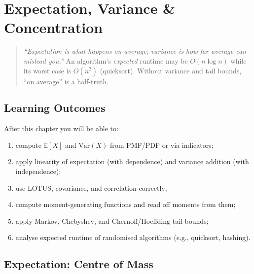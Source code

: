 \chapter{Expectation, Variance \& Concentration}
\label{ch:expectation}

\begin{quote}
\emph{``Expectation is what happens on average; variance is how far average can mislead you.''} An algorithm's \emph{expected} runtime may be $O(n\log n)$ while its worst case is $O(n^2)$ (quicksort). Without variance and tail bounds, ``on average'' is a half-truth.
\end{quote}

\noindent{}
\vspace{0.4em}

\section*{Learning Outcomes}
After this chapter you will be able to:
\begin{enumerate}[label=(L\arabic*)]
    \item compute $\mathbb{E}[X]$ and $\mathrm{Var}(X)$ from PMF/PDF or via indicators;
    \item apply linearity of expectation (with dependence) and variance addition (with independence);
    \item use LOTUS, covariance, and correlation correctly;
    \item compute moment-generating functions and read off moments from them;
    \item apply Markov, Chebyshev, and Chernoff/Hoeffding tail bounds;
    \item analyse expected runtime of randomised algorithms (e.g., quicksort, hashing).
\end{enumerate}

\section{Expectation: Centre of Mass}
\label{sec:expectation}

